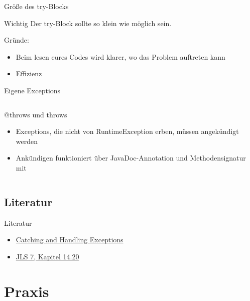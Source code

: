 \documentclass[usepdftitle=false,hyperref={pdfpagelabels=false}]{beamer}
\begin{document}
\begin{frame}{Größe des try-Blocks}
    \begin{block}{Wichtig}
        Der try-Block sollte so klein wie möglich sein.
    \end{block}

    Gründe:
    \begin{itemize}
        \item Beim lesen eures Codes wird klarer, wo das Problem
              auftreten kann
        \item Effizienz
    \end{itemize}
\end{frame}

\begin{frame}{Eigene Exceptions}
    \inputminted[linenos=true, numbersep=5pt, tabsize=4, fontsize=\small, label=UniverseExplodeException.java, frame=lines]{java}{UniverseExplodeException.java}
\end{frame}

\begin{frame}{@throws und throws}
    \begin{itemize}
        \item Exceptions, die nicht von RuntimeException erben, müssen angekündigt werden
        \item Ankündigen funktioniert über JavaDoc-Annotation  und Methodensignatur mit 
    \end{itemize}

   \inputminted[linenos=false, numbersep=5pt, tabsize=4, fontsize=\small, firstline=11, lastline=21]{java}{singleLines.java}
\end{frame}

\subsection{Literatur}
\begin{frame}{Literatur}
    \begin{itemize}
        \item \href{http://docs.oracle.com/javase/tutorial/essential/exceptions/handling.html}{Catching and Handling Exceptions}
        \item \href{http://docs.oracle.com/javase/specs/jls/se7/html/jls-14.html\#jls-14.20}{JLS 7, Kapitel 14.20}
    \end{itemize}
\end{frame}

\section{Praxis}
\end{document}
